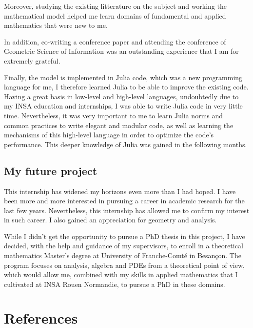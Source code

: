 \documentclass[american,]{article}
\theoremstyle{definition}
\theoremstyle{definition}
\theoremstyle{definition}
\theoremstyle{remark}
\begin{document}
Moreover, studying the existing litterature on the subject and working
the mathematical model helped me learn domains
of fundamental and applied mathematics that were new to me.

In addition, co-writing a conference paper and attending the conference
of Geometric Science of Information was an outstanding experience
that I am for extremely grateful.

Finally, the model is implemented in Julia code, which was a new programming language for me,
I therefore learned Julia to be able to improve the existing code.
Having a great basis in low-level and high-level languages,
undoubtedly due to my INSA education and internships,
I was able to write Julia code in very little time.
Nevertheless, it was very important to me to learn
Julia norms and common practices to write elegant and modular code,
as well as learning the mechanisms of this high-level language
in order to optimize the code's performance.
This deeper knowledge of Julia was gained in the following months.

\hypertarget{my-future-project}{%
\subsection{My future project}\label{my-future-project}}

This internship has widened my horizons even more than I had hoped.
I have been more and more interested in pursuing a career in academic research
for the last few years.
Nevertheless, this internship has allowed me to confirm my interest
in such career.
I also gained an appreciation for geometry and analysis.

While I didn't get the opportunity to pursue a PhD thesis in this project,
I have decided, with the help and guidance of my supervisors, to enroll in a
theoretical mathematics Master's degree at University of Franche-Comté in Besançon.
The program focuses on analysis, algebra and PDEs from a theoretical point of view,
which would allow me, combined with my skills in applied mathematics that
I cultivated at INSA Rouen Normandie, to pursue a PhD in these domains.

\pagebreak

\hypertarget{references}{%
\section*{References}\label{references}}
\end{document}

